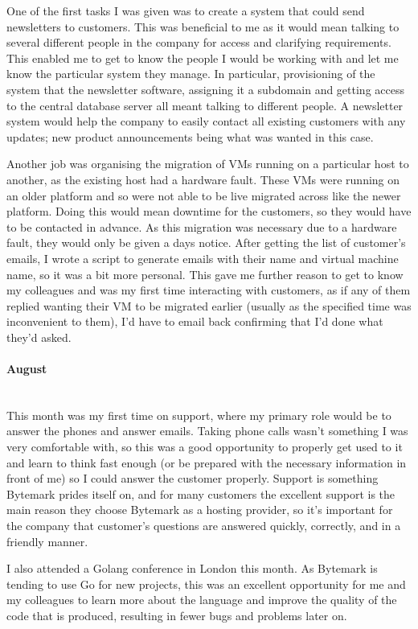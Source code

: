 \documentclass[12pt,a4paper]{article}
\newcommand{\paragraphnl}[1]{\paragraph{#1}\mbox{}\\}
\begin{document}
	One of the first tasks I was given was to create a system that could send
	newsletters to customers. This was beneficial to me as it would mean
	talking to several different people in the company for access and
	clarifying requirements. This enabled me to get to know the people I would
	be working with and let me know the particular system they manage. In
	particular, provisioning of the system that the newsletter software,
	assigning it a subdomain and getting access to the central database server
	all meant talking to different people. A newsletter system would help the
	company to easily contact all existing customers with any updates; new
	product announcements being what was wanted in this case.

	Another job was organising the migration of VMs running on a particular
	host to another, as the existing host had a hardware fault. These VMs were
	running on an older platform and so were not able to be live migrated
	across like the newer platform. Doing this would mean downtime for the
	customers, so they would have to be contacted in advance. As this migration
	was necessary due to a hardware fault, they would only be given a days
	notice. After getting the list of customer's emails, I wrote a script to
	generate emails with their name and virtual machine name, so it was a bit
	more personal. This gave me further reason to get to know my colleagues and
	was my first time interacting with customers, as if any of them replied
	wanting their VM to be migrated earlier (usually as the specified time was
	inconvenient to them), I'd have to email back confirming that I'd done what
	they'd asked.

\paragraphnl{August}
	This month was my first time on support, where my primary role would be to
	answer the phones and answer emails. Taking phone calls wasn't something I
	was very comfortable with, so this was a good opportunity to properly get
	used to it and learn to think fast enough (or be prepared with the
	necessary information in front of me) so I could answer the customer
	properly. Support is something Bytemark prides itself on, and for many
	customers the excellent support is the main reason they choose Bytemark as
	a hosting provider, so it's important for the company that customer's
	questions are answered quickly, correctly, and in a friendly manner.

	I also attended a Golang conference in London this month. As Bytemark is
	tending to use Go for new projects, this was an excellent opportunity for
	me and my colleagues to learn more about the language and improve the
	quality of the code that is produced, resulting in fewer bugs and problems
	later on.
\end{document}
